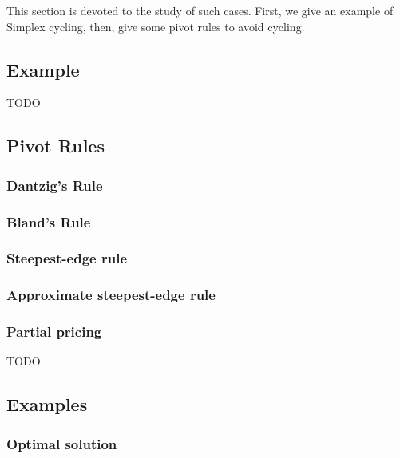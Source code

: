 This section is devoted to the study of such cases. First, we give an example of Simplex cycling, then, give some pivot rules to avoid cycling.

\subsection{Example}

TODO

\subsection{Pivot Rules}
\subsubsection{Dantzig's Rule}
\subsubsection{Bland's Rule}
\subsubsection{Steepest-edge rule}
\subsubsection{Approximate steepest-edge rule}
\subsubsection{Partial pricing}

TODO

\subsection{Examples}
\subsubsection{Optimal solution}


